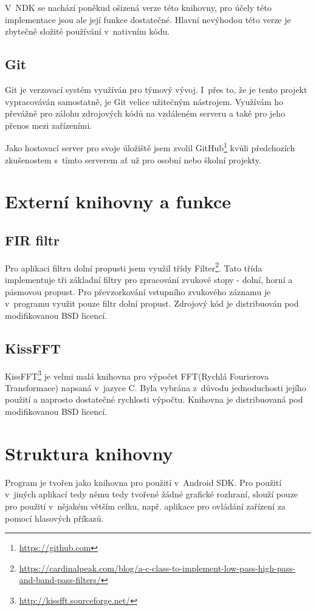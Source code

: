 V~NDK se nachází poněkud ošizená verze této knihovny, pro účely této implementace jsou ale její funkce dostatečné. Hlavní nevýhodou této verze je zbytečně složité používání v~nativním kódu.

\subsection{Git}
Git je verzovací systém využíván pro týmový vývoj. I~přes to, že je tento projekt vypracováván samostatně, je Git velice užitečným nástrojem. Využívám ho převážně pro zálohu zdrojových kódů na vzdáleném serveru a také pro jeho přenos mezi zařízeními.

Jako hostovací server pro svoje úložiště jsem zvolil GitHub\footnote{\url{https://github.com}} kvůli předchozích zkušenostem s~tímto serverem ať už pro osobní nebo školní projekty.

\section{Externí knihovny a funkce}

\subsection{FIR filtr}
Pro aplikaci filtru dolní propusti jsem využil třídy Filter\footnote{\url{https://cardinalpeak.com/blog/a-c-class-to-implement-low-pass-high-pass-and-band-pass-filters/}}. Tato třída implementuje tři základní filtry pro zpracování zvukové stopy - dolní, horní a pásmovou propust. Pro převzorkování vstupního zvukového záznamu je v~programu využit pouze filtr dolní propust. Zdrojový kód je distribuován pod modifikovanou BSD licencí.

\subsection{KissFFT}
KissFFT\footnote{\url{http://kissfft.sourceforge.net/}} je velmi malá knihovna pro výpočet FFT(Rychlá Fourierova Transformace) napsaná v~jazyce C. Byla vybrána z~důvodu jednoduchosti jejího použití a naprosto dostatečné rychlosti výpočtu. Knihovna je distribuovaná pod modifikovanou BSD licencí.

\section{Struktura knihovny}
Program je tvořen jako knihovna pro použití v~Android SDK. Pro použití v~jiných aplikací tedy němu tedy tvořené žádné grafické rozhraní, slouží pouze pro použití v~nějakém větším celku, např. aplikace pro ovládání zařízení za pomocí hlasových příkazů. 


